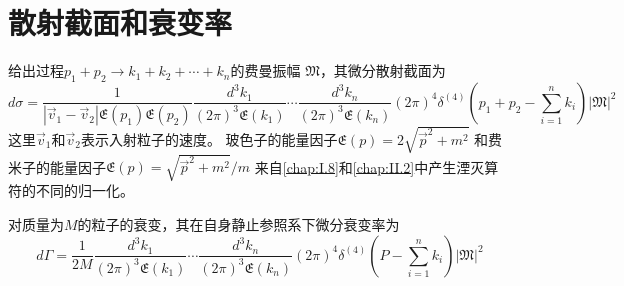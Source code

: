 \documentclass{ctexart}
\begin{document}
\section{散射截面和衰变率}

给出过程$p_1+p_2\rightarrow k_1+k_2+\cdots+k_n$的费曼振幅
$\mathfrak{M}$，其微分散射截面为
\begin{equation}\label{equ:app.c.21}
	d\sigma=\frac{1}{|\vec{v}_1-\vec{v}_2|\mathfrak{E}(p_1)\mathfrak{E}(p_2)}
	\frac{d^3k_1}{(2\pi)^3\mathfrak{E}(k_1)}\cdots
	\frac{d^3k_n}{(2\pi)^3\mathfrak{E}(k_n)}(2\pi)^4
	\delta^{(4)}(p_1+p_2-\sum_{i=1}^nk_i)|\mathfrak{M}|^2
\end{equation}
这里$\vec{v}_1$和$\vec{v}_2$表示入射粒子的速度。
玻色子的能量因子$\mathfrak{E}(p)=2\sqrt{\vec{p}^2+m^2}$
和费米子的能量因子$\mathfrak{E}(p)=\sqrt{\vec{p}^2+m^2}/m$
来自\ref{chap:I.8}和\ref{chap:II.2}中产生湮灭算符的不同的归一化。

对质量为$M$的粒子的衰变，其在自身静止参照系下微分衰变率为
\begin{equation}\label{equ:app.c.22}
	d\Gamma=\frac{1}{2M}\frac{d^3k_1}{(2\pi)^3\mathfrak{E}(k_1)}
	\cdots\frac{d^3k_n}{(2\pi)^3\mathfrak{E}(k_n)}(2\pi)^4
	\delta^{(4)}(P-\sum_{i=1}^nk_i)|\mathfrak{M}|^2
\end{equation}
\end{document}
